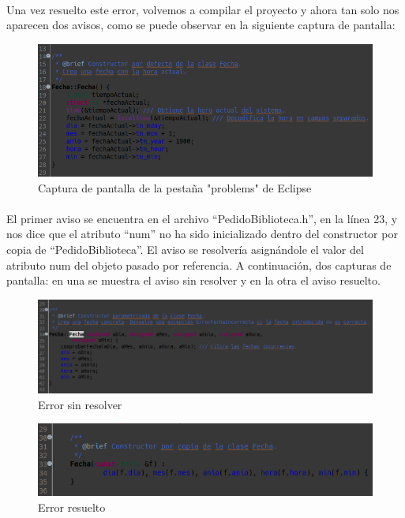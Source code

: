\paragraph{}Una vez resuelto este error, volvemos a compilar el proyecto y ahora tan solo nos aparecen dos avisos, como se puede observar en la siguiente captura de pantalla:

\begin{figure}[H]
	\centering
	\includegraphics[scale=0.48]{img/captura9.png}
	\caption{Captura de pantalla de la pestaña "problems" de Eclipse}
	\label{captura9}
\end{figure}

\paragraph{}El primer aviso se encuentra en el archivo “PedidoBiblioteca.h”, en la línea 23, y nos dice que el atributo “num” no ha sido inicializado dentro del constructor por copia de “PedidoBiblioteca”. El aviso se resolvería asignándole el valor del atributo num del objeto pasado por referencia. A continuación, dos capturas de pantalla: en una se muestra el aviso sin resolver y en la otra el aviso resuelto.

\begin{figure}[H]
	\centering
	\includegraphics[scale=0.85]{img/captura10.png}
	\caption{Error sin resolver}
	\label{captura10}
\end{figure}

\begin{figure}[H]
	\centering
	\includegraphics[scale=1]{img/captura11.png}
	\caption{Error resuelto}
	\label{captura11}
\end{figure}

